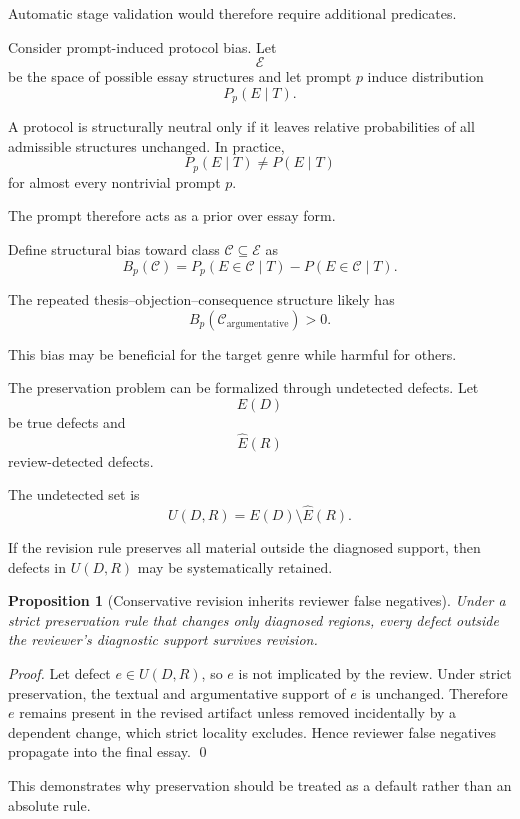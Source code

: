 \documentclass[11pt]{article}
\newtheorem{proposition}[definition]{Proposition}
\begin{document}
Automatic stage validation would therefore require additional predicates.

Consider prompt-induced protocol bias. Let
\[
    \mathcal{E}
\]
be the space of possible essay structures and let prompt \(p\) induce distribution
\[
    P_p(E\mid T).
\]

A protocol is structurally neutral only if it leaves relative probabilities of all admissible structures unchanged. In practice,
\[
    P_p(E\mid T)
    \neq
    P(E\mid T)
\]
for almost every nontrivial prompt \(p\).

The prompt therefore acts as a prior over essay form.

Define structural bias toward class \(\mathcal{C}\subseteq\mathcal{E}\) as
\[
    B_p(\mathcal{C})
    =
    P_p(E\in\mathcal{C}\mid T)
    -
    P(E\in\mathcal{C}\mid T).
\]

The repeated thesis--objection--consequence structure likely has
\[
    B_p(\mathcal{C}_{\mathrm{argumentative}})>0.
\]

This bias may be beneficial for the target genre while harmful for others.

The preservation problem can be formalized through undetected defects. Let
\[
    E(D)
\]
be true defects and
\[
    \widehat E(R)
\]
review-detected defects.

The undetected set is
\[
    U(D,R)
    =
    E(D)\setminus\widehat E(R).
\]

If the revision rule preserves all material outside the diagnosed support, then defects in \(U(D,R)\) may be systematically retained.

\begin{proposition}[Conservative revision inherits reviewer false negatives]
Under a strict preservation rule that changes only diagnosed regions, every defect outside the reviewer's diagnostic support survives revision.
\end{proposition}

\begin{proof}
Let defect \(e\in U(D,R)\), so \(e\) is not implicated by the review. Under strict preservation, the textual and argumentative support of \(e\) is unchanged. Therefore \(e\) remains present in the revised artifact unless removed incidentally by a dependent change, which strict locality excludes. Hence reviewer false negatives propagate into the final essay. \qed
\end{proof}

This demonstrates why preservation should be treated as a default rather than an absolute rule.
\end{document}
